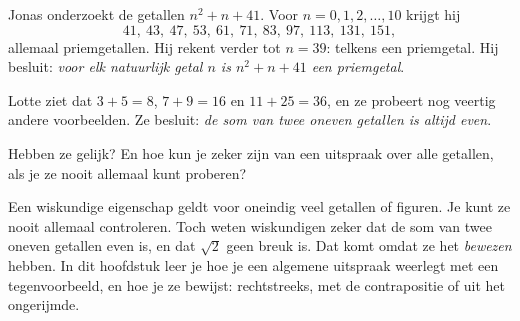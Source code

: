 %


\begin{probleem}
Jonas onderzoekt de getallen $n^2 + n + 41$. Voor $n = 0, 1, 2, \ldots, 10$ krijgt hij
\[ 41,\ 43,\ 47,\ 53,\ 61,\ 71,\ 83,\ 97,\ 113,\ 131,\ 151 , \]
allemaal priemgetallen. Hij rekent verder tot $n = 39$: telkens een priemgetal. Hij besluit: \textit{voor elk natuurlijk getal $n$ is $n^2 + n + 41$ een priemgetal}.

Lotte ziet dat $3 + 5 = 8$, $7 + 9 = 16$ en $11 + 25 = 36$, en ze probeert nog veertig andere voorbeelden. Ze besluit: \textit{de som van twee oneven getallen is altijd even}.

Hebben ze gelijk? En hoe kun je zeker zijn van een uitspraak over alle getallen, als je ze nooit allemaal kunt proberen?
\end{probleem}


Een wiskundige eigenschap geldt voor oneindig veel getallen of figuren. Je kunt ze nooit allemaal controleren. Toch weten wiskundigen zeker dat de som van twee oneven getallen even is, en dat $\sqrt2$ geen breuk is. Dat komt omdat ze het \textit{bewezen} hebben. In dit hoofdstuk leer je hoe je een algemene uitspraak weerlegt met een tegenvoorbeeld, en hoe je ze bewijst: rechtstreeks, met de contrapositie of uit het ongerijmde.

